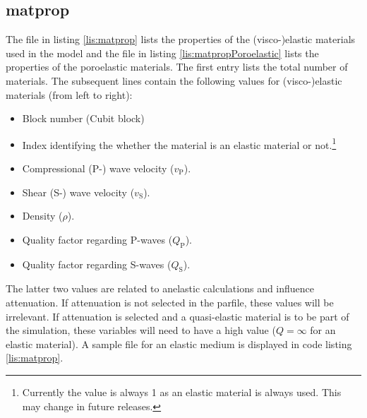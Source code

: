     	\subsection{matprop}
    	\label{subsec:matprop}
    		
    		The file in listing \ref{lis:matprop} lists the properties of the (visco-)elastic materials used in the model and the file in listing \ref{lis:matpropPoroelastic} lists the properties of the poroelastic materials. The first entry lists the total number of materials. 
    		The subsequent lines contain the following values for (visco-)elastic materials (from left to right):
    		\begin{itemize}
    			\item Block number (Cubit block)
    			\item Index identifying the whether the material is an elastic material or not.\footnote{Currently the value is always 1 as an elastic material is always used. This may change in future releases.}
    			\item Compressional (P-) wave velocity ($v_\mathrm{P}$).
    			\item Shear (S-) wave velocity ($v_\mathrm{S}$).
    			\item Density ($\rho$).
    			\item Quality factor regarding P-waves ($Q_\mathrm{P}$).
    			\item Quality factor regarding S-waves ($Q_\mathrm{S}$). 
    		\end{itemize}
    		The latter two values are related to anelastic calculations and influence attenuation. If attenuation is not selected in the parfile, these values will be irrelevant. If attenuation is selected and a quasi-elastic material is to be part of the simulation, these variables will need to have a high value ($Q = \infty$ for an elastic material). A sample file for an elastic medium is displayed in code listing \ref{lis:matprop}. \\

    		

